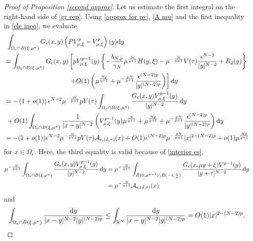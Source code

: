 \documentclass[reqno]{amsart}
\theoremstyle{remark}
\newcommand{\ep}{\epsilon}
\newcommand{\ga}{\gamma}
\newcommand{\R}{\mathbb{R}}
\newcommand{\mca}{\mathcal{A}}
\newcommand{\dy}{\textup{d}y}
\newcommand{\mx}{{\mu,\xi}}
\renewcommand{\(}{\left(}
\renewcommand{\)}{\right)}
\numberwithin{equation}{section}
\begin{document}
\begin{proof}[Proof of Proposition \ref{second approx}]
Let us estimate the first integral on the right-hand side of \eqref{gr rep}. Using \eqref{approx for pv}, \eqref{A mu} and the first inequality in \eqref{ele ineq}, we evaluate
\begin{equation}\label{inner est}
\begin{aligned}
&\ \int_{\Omega_\ep \cap B(\xi,\mu^\kappa)} G_\ep(x,y)\(PV_\mx^p-V_\mx^p\)(y)\dy \\
&= \int_{\Omega_\ep \cap B(\xi,\mu^\kappa)} G_\ep(x,y) \left[p V_\mx^{p-1}(y) \left\{-\frac{b_{N,p}}{\ga_N}\mu^{\frac{N}{q+1}}H(y,\xi) - \mu^{-\frac{N}{p+1}}V(\tau)\frac{\ep^{N-2}}{|y|^{N-2}} + R_2(y)\right\} \right. \\
&\hspace{100pt} \left. + O(1)\(\mu^{\frac{Np}{q+1}} + \mu^{-\frac{pN}{p+1}} \frac{\ep^{(N-2)p}}{|y|^{(N-2)p}}\)\right] \dy\\
&=-\left(1+o(1)\right) \ep^{N-2}\mu^{-\frac{N}{p+1}} pV(\tau) \int_{\Omega_\ep \cap B(\xi,\mu^\kappa)}\frac{G_\ep(x,y) V_\mx^{p-1}(y)}{|y|^{N-2}}\, \dy\\
&\ + O(1) \int_{\Omega_\ep \cap B(\xi,\mu^\kappa)}\frac{1}{|x-y|^{N-2}} \(V_\mx^{p-1}(y) \mu^{\frac{N}{q+1}} + \mu^{\frac{Np}{q+1}} + \mu^{-\frac{pN}{p+1}} \frac{\ep^{(N-2)p}}{|y|^{(N-2)p}}\)\dy\\
&=-(1+o(1)) \ep^{N-2}\mu^{-\frac{N}{q+1}} pV(\tau) \mca_{\ep,(d,\tau)}(x) + O(1) \ep^{(N-2)p}\mu^{-\frac{pN}{p+1}} |x|^{2-(N-2)p} + o(1)\mu^{\frac{Np}{q+1}}
\end{aligned}
\end{equation}
for $x \in \Omega_\ep$. Here, the third equality is valid because of \eqref{interior es},
\begin{align*}
\mu^{-\frac{N}{p+1}} \int_{\Omega_\ep \cap B(\xi,\mu^\kappa)}\frac{G_\ep(x,y)V_\mx^{p-1}(y)}{|y|^{N-2}}\, \dy
&= \mu^{-\frac{N}{q+1}} \int_{B(0,\mu^{\kappa-1})\setminus B(-\tau,\frac{\ep}{\mu})}\frac{G_\ep(x,\mu y+\xi)V^{p-1}(y)}{ |y+\tau|^{N-2}}\, \dy \\
&= \mu^{-\frac{N}{q+1}} \mca_{\ep,(d,\tau)}(x)
\end{align*}
and
\[\int_{\Omega_\ep \cap B(\xi,\mu^\kappa)}\frac{\dy}{|x-y|^{N-2}|y|^{(N-2)p}} \le \int_{\R^N} \frac{\dy}{|x-y|^{N-2}|y|^{(N-2)p}} = O(1)|x|^{2-(N-2)p}.\]


\end{proof}
\end{document}
